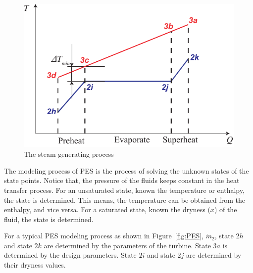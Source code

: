 \noindent \begin{figure}[htbp]
\begin{center}
	\includegraphics[width = 0.5\columnwidth]{fig/PES_TQ}
	\caption{The steam generating process}
	\label{fig:PES_TQ}
\end{center}
\end{figure}

The modeling process of PES is the process of solving the unknown states of the state points. Notice that, the pressure of the fluids keeps constant in the heat transfer process. For an unsaturated state, known the temperature or enthalpy, the state is determined. This means, the temperature can be obtained from the enthalpy, and vice versa. For a saturated state, known the dryness ($x$) of the fluid, the state is determined.

For a typical PES modeling process as shown in Figure~\ref{fig:PES}, $\dot{m}_2$, state $2h$ and state $2k$ are determined by the parameters of the turbine. State $3a$ is determined by the design parameters. State $2i$ and state $2j$ are determined by their dryness values. 

